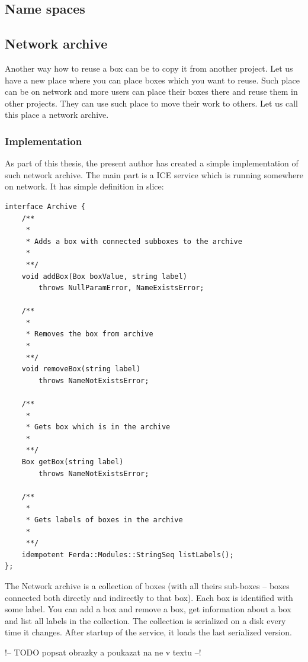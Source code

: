 \documentclass[a4paper,12pt]{book}
\begin{document}
\subsection{Name spaces}
\subsection{Network archive}
Another way how to reuse a box can be to copy it from another project. Let us have a new place where you can place boxes which you want to reuse. Such place can be on network and more users can place their boxes there and reuse them in other projects. They can use such place to move their work to others. Let us call this place a network archive.

\subsubsection{Implementation}
As part of this thesis, the present author has created a simple implementation of such network archive. The main part is a ICE service which is running somewhere on network. It has simple definition in slice:
\begin{verbatim}
interface Archive {
	/**
	 *
	 * Adds a box with connected subboxes to the archive
	 *
	 **/
	void addBox(Box boxValue, string label)
		throws NullParamError, NameExistsError;

	/**
	 *
	 * Removes the box from archive
	 *
	 **/
	void removeBox(string label)
		throws NameNotExistsError;

	/**
	 *
	 * Gets box which is in the archive
	 *
	 **/
	Box getBox(string label)
		throws NameNotExistsError;

	/**
	 *
	 * Gets labels of boxes in the archive
	 *
	 **/
	idempotent Ferda::Modules::StringSeq listLabels();
};
\end{verbatim}

The Network archive is a collection of boxes (with all theirs sub-boxes -- boxes connected both directly and indirectly to that box). Each box is identified with some label. You can add a box and remove a box, get information about a box and list all labels in the collection. The collection is serialized on a disk every time it changes. After startup of the service, it loads the last serialized version.

!-- TODO popsat obrazky a poukazat na ne v textu --!
\end{document}
